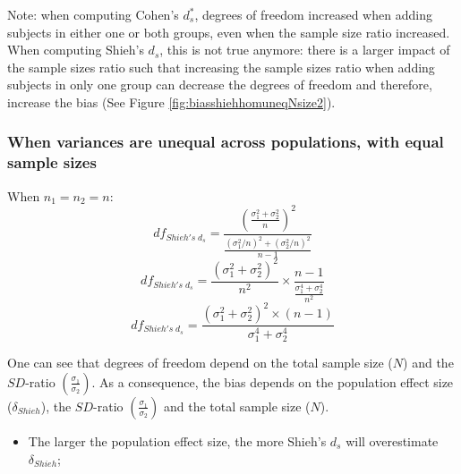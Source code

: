\documentclass[
  english,
  man]{apa6}
\providecommand{\tightlist}{%
  \setlength{\itemsep}{0pt}\setlength{\parskip}{0pt}}
\begin{document}
Note: when computing Cohen's \(d^*_s\), degrees of freedom increased when adding subjects in either one or both groups, even when the sample size ratio increased. When computing Shieh's \(d_s\), this is not true anymore: there is a larger impact of the sample sizes ratio such that increasing the sample sizes ratio when adding subjects in only one group can decrease the degrees of freedom and therefore, increase the bias (See Figure \ref{fig:biasshiehhomuneqNsize2}).

\hypertarget{when-variances-are-unequal-across-populations-with-equal-sample-sizes-1}{%
\subsubsection{When variances are unequal across populations, with equal sample sizes}\label{when-variances-are-unequal-across-populations-with-equal-sample-sizes-1}}

When \(n_1=n_2=n\):
\[df_{Shieh's \; d_s} = \frac{\left( \frac{\sigma_1^2+\sigma_2^2}{n} \right)^2}{\frac{(\sigma_1^2/n)^2+(\sigma_2^2/n)^2}{n-1}}\]
\[df_{Shieh's \; d_s} = \frac{(\sigma_1^2+\sigma_2^2)^2}{n^2} \times\frac{n-1}{\frac{\sigma_1^4+\sigma_2^4}{n^2}}\]
\[df_{Shieh's \; d_s} = \frac{(\sigma_1^2+\sigma_2^2)^2 \times (n-1)}{\sigma_1^4+\sigma_2^4}\]

One can see that degrees of freedom depend on the total sample size (\(N\)) and the \(SD\)-ratio \(\left( \frac{\sigma_1}{\sigma_2}\right)\). As a consequence, the bias depends on the population effect size (\(\delta_{Shieh}\)), the \(SD\)-ratio \(\left( \frac{\sigma_1}{\sigma_2}\right)\) and the total sample size (\(N\)).

\begin{itemize}
\tightlist
\item
  The larger the population effect size, the more Shieh's \(d_s\) will overestimate \(\delta_{Shieh}\);
\end{itemize}
\end{document}
